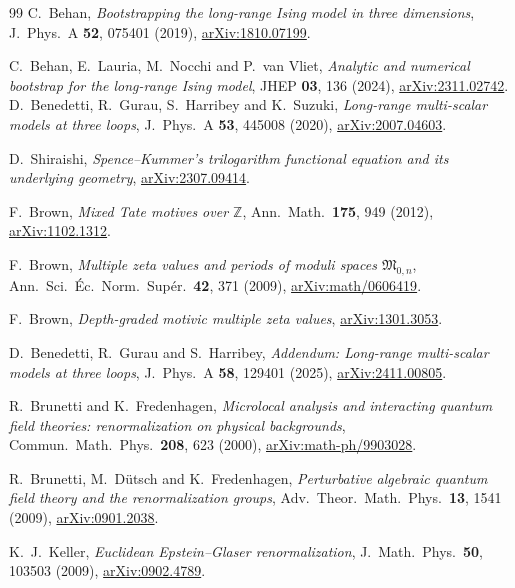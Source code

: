 \documentclass[11pt,a4paper]{article}
\numberwithin{equation}{section}
\begin{document}
\begin{thebibliography}{99}
C.~Behan,
\emph{Bootstrapping the long-range Ising model in three dimensions},
J.\ Phys.\ A \textbf{52}, 075401 (2019),
\href{https://arxiv.org/abs/1810.07199}{arXiv:1810.07199}.

C.~Behan, E.~Lauria, M.~Nocchi and P.~van Vliet,
\emph{Analytic and numerical bootstrap for the long-range Ising model},
JHEP \textbf{03}, 136 (2024),
\href{https://arxiv.org/abs/2311.02742}{arXiv:2311.02742}.
D.~Benedetti, R.~Gurau, S.~Harribey and K.~Suzuki,
\emph{Long-range multi-scalar models at three loops},
J.\ Phys.\ A \textbf{53}, 445008 (2020),
\href{https://arxiv.org/abs/2007.04603}{arXiv:2007.04603}.

D.~Shiraishi,
\emph{Spence--Kummer's trilogarithm functional equation and its underlying geometry},
\href{https://arxiv.org/abs/2307.09414}{arXiv:2307.09414}.

F.~Brown,
\emph{Mixed Tate motives over $\mathbb Z$},
Ann.\ Math.\ \textbf{175}, 949 (2012),
\href{https://arxiv.org/abs/1102.1312}{arXiv:1102.1312}.

F.~Brown,
\emph{Multiple zeta values and periods of moduli spaces $\mathfrak M_{0,n}$},
Ann.\ Sci.\ \'Ec.\ Norm.\ Sup\'er.\ \textbf{42}, 371 (2009),
\href{https://arxiv.org/abs/math/0606419}{arXiv:math/0606419}.

F.~Brown,
\emph{Depth-graded motivic multiple zeta values},
\href{https://arxiv.org/abs/1301.3053}{arXiv:1301.3053}.

D.~Benedetti, R.~Gurau and S.~Harribey,
\emph{Addendum: Long-range multi-scalar models at three loops},
J.\ Phys.\ A \textbf{58}, 129401 (2025),
\href{https://arxiv.org/abs/2411.00805}{arXiv:2411.00805}.

R.~Brunetti and K.~Fredenhagen,
\emph{Microlocal analysis and interacting quantum field theories: renormalization on physical backgrounds},
Commun.\ Math.\ Phys.\ \textbf{208}, 623 (2000),
\href{https://arxiv.org/abs/math-ph/9903028}{arXiv:math-ph/9903028}.

R.~Brunetti, M.~D\"utsch and K.~Fredenhagen,
\emph{Perturbative algebraic quantum field theory and the renormalization groups},
Adv.\ Theor.\ Math.\ Phys.\ \textbf{13}, 1541 (2009),
\href{https://arxiv.org/abs/0901.2038}{arXiv:0901.2038}.

K.~J.~Keller,
\emph{Euclidean Epstein--Glaser renormalization},
J.\ Math.\ Phys.\ \textbf{50}, 103503 (2009),
\href{https://arxiv.org/abs/0902.4789}{arXiv:0902.4789}.


\end{thebibliography}
\end{document}
